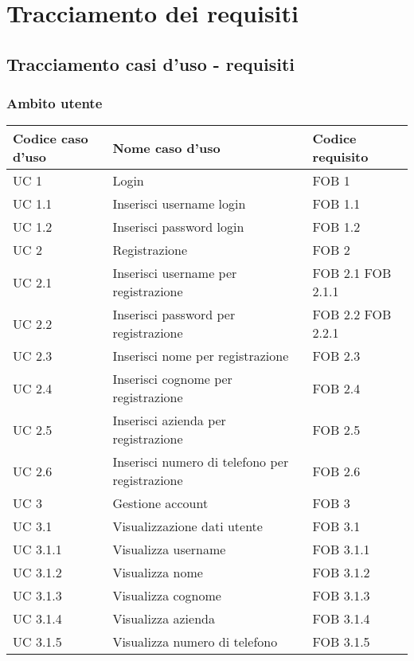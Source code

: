 \section{Tracciamento dei requisiti}
\subsection{Tracciamento casi d'uso - requisiti}
\subsubsection{Ambito utente}
\begin{longtable}{p{} p{} p{} }
\rowcolors{2}{light}{}
\textbf{Codice \newline caso d'uso} & \textbf{Nome caso d'uso} & \textbf{Codice requisito} \\
\midrule

\midrule
UC 1 & Login & FOB 1\\

\midrule
UC 1.1 & Inserisci username login & FOB 1.1\\
\midrule
UC 1.2 & Inserisci password login & FOB 1.2\\

\midrule
UC 2 & Registrazione & FOB 2\\

\midrule
UC 2.1 & Inserisci username per registrazione & FOB 2.1 \newline FOB 2.1.1\\
\midrule
UC 2.2 & Inserisci password per registrazione & FOB 2.2 \newline FOB 2.2.1\\
\midrule
UC 2.3 & Inserisci nome per registrazione & FOB 2.3\\
\midrule
UC 2.4 & Inserisci cognome per registrazione & FOB 2.4\\
\midrule
UC 2.5 & Inserisci azienda per registrazione & FOB 2.5\\
\midrule
UC 2.6 & Inserisci numero di telefono per \newline registrazione & FOB 2.6\\



\midrule
UC 3 & Gestione account & FOB 3\\

\midrule
UC 3.1 & Visualizzazione dati utente & FOB 3.1\\
\midrule
UC 3.1.1 & Visualizza username & FOB 3.1.1\\
\midrule
UC 3.1.2 & Visualizza nome & FOB 3.1.2\\
\midrule
UC 3.1.3 & Visualizza cognome & FOB 3.1.3\\
\midrule
UC 3.1.4 & Visualizza azienda & FOB 3.1.4\\
\midrule
UC 3.1.5 & Visualizza numero di telefono & FOB 3.1.5\\


\end{longtable}
